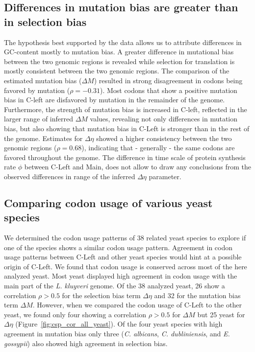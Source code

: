 \documentclass[12pt,draft]{article}
\begin{document}
\subsection*{Differences in mutation bias are greater than in selection bias}
The hypothesis best supported by the data allows us to attribute differences in GC-content mostly to mutation bias. 
A greater difference in mutational bias between the two genomic regions is revealed while selection for translation is mostly consistent between the two genomic regions. 
The comparison of the estimated mutation bias ($\Delta M$) resulted in strong disagreement in codons being favored by mutation ($\rho = -0.31$). 
Most codons that show a positive mutation bias in C-left are disfavored by mutation in the remainder of the genome.  
Furthermore, the strength of mutation bias is increased in C-left, reflected in the larger range of inferred $\Delta M$ values, revealing not only differences in mutation bias, but also showing that mutation bias in C-Left is stronger than in the rest of the genome. 
Estimates for $\Delta \eta$ showed a higher consistency between the two genomic regions ($\rho = 0.68$), indicating that - generally - the same codons are favored throughout the genome. 
The difference in time scale of protein synthesis rate $\phi$ between C-Left and Main, does not allow to draw any conclusions from the observed differences in range of the inferred $\Delta \eta$ parameter.

\subsection*{Comparing codon usage of various yeast species}
We determined the codon usage patterns of 38 related yeast species to explore if one of the species shows a similar codon usage pattern.
Agreement in codon usage patterns between C-Left and other yeast species would hint at a possible origin of C-Left.
We found that codon usage is conserved across most of the here analyzed yeast. 
Most yeast displayed high agreement in codon usage with the main part of the \textit{L. kluyveri} genome. Of the 38 analyzed yeast, 26 show a correlation $\rho > 0.5$ for the selection bias term $\Delta \eta$ and 32 for the mutation bias term $\Delta M$.
However, when we compared the codon usage of C-Left to the other yeast, we found only four showing a correlation $\rho > 0.5$ for $\Delta M$ but 25 yeast for $\Delta \eta$ (Figure~\ref{fig:csp_cor_all_yeast}).
Of the four yeast species with high agreement in mutation bias only three (\textit{C. albicans}, \textit{C. dubliniensis}, and \textit{E. gossypii}) also showed high agreement in selection bias.
\end{document}
